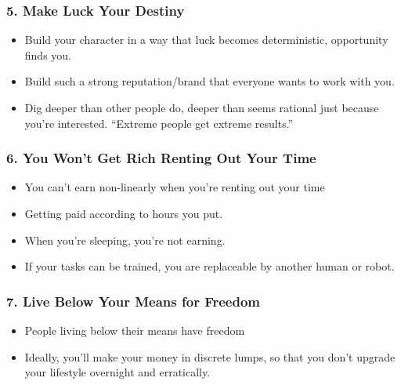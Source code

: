 \begin{frame}[fragile]
\frametitle{5. Make Luck Your Destiny}
\begin{itemize}
\item Build your character in a way that luck becomes deterministic, opportunity finds you.
\item Build such a strong reputation/brand that everyone wants to work with you.
\item  Dig deeper than other people do, deeper than seems rational just because you're interested. ``Extreme people get extreme results.''
\end{itemize}
\end{frame}

\begin{frame}[fragile]
\frametitle{6. You Won't Get Rich Renting Out Your Time}
\begin{itemize}
\item You can't earn non-linearly when you're renting out your time
\item Getting paid according to hours you put.
\item When you're sleeping, you're not earning.
\item If your tasks can be trained, you are replaceable by another human or robot.
\end{itemize}
\end{frame}


\begin{frame}[fragile]
\frametitle{7. Live Below Your Means for Freedom}
\begin{itemize}
\item People living below their means have freedom
\item Ideally, you'll make your money in discrete lumps, so that you don't upgrade your lifestyle overnight and erratically.
\end{itemize}
\end{frame}


